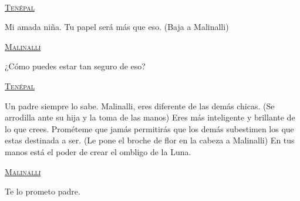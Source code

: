 \begin{center}
\\
\par
\textsc{\underline{Tenépal }}
\\
\par
Mi amada niña. Tu papel será más que eso. (Baja a Malinalli)
\\
\par
\textsc{\underline{Malinalli}}
\\
\par
¿Cómo puedes estar tan seguro de eso?
\\
\par
\textsc{\underline{Tenépal }}
\\
\par
Un padre siempre lo sabe. Malinalli, eres diferente de las demás chicas. (Se arrodilla ante su hija y la toma de las manos) Eres más inteligente y brillante de lo que crees. Prométeme que jamás permitirás que los demás subestimen los que estas destinada a ser. (Le pone el broche de flor en la cabeza a Malinalli) En tus manos está el poder de crear el ombligo de la Luna.
\\
\par
\textsc{\underline{Malinalli}}
\\
\par
Te lo prometo padre. 
\end{center}